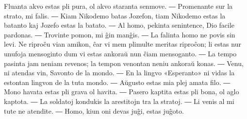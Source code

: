 Fluanta akvo estas pli pura, ol akvo staranta senmove. ― Promenante sur la strato, mi falis. ― Kiam Nikodemo batas Jozefon, tiam Nikodemo estas la batanto kaj Jozefo estas la batato. ― Al homo, pekinta senintence, Dio facile pardonas. ― Trovinte pomon, mi ĝin manĝis. ― La falinta homo ne povis sin levi. Ne riproĉu vian amikon, ĉar vi mem plimulte meritas riproĉon; li estas nur unufoja mensoginto\unuakomon{} dum vi estas ankoraŭ nun ĉiam mensoganto. ― La tempo pasinta jam neniam revenos; la tempon venontan neniu ankoraŭ konas. ― Venu, ni atendas vin, Savonto de la mondo. ― En la lingvo «Esperanto» ni vidas la estontan lingvon de la tuta mondo. ― Aŭgusto estas mia plej amata filo. ― Mono havata estas pli grava ol havita. ― Pasero kaptita estas pli bona, ol aglo kaptota. ― La soldatoj kondukis la arestitojn tra la stratoj. ― Li venis al mi tute ne atendite. ― Homo, kiun oni devas juĝi, estas juĝoto.

